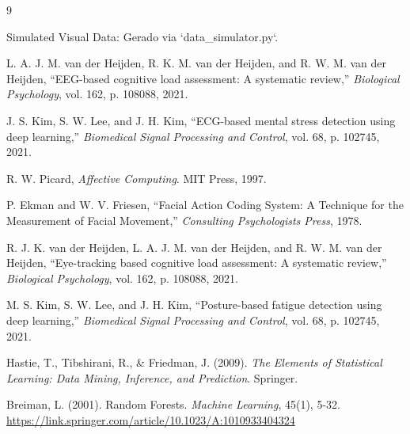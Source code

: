 \documentclass{article}
\begin{document}
\begin{thebibliography}{9}

 Simulated Visual Data: Gerado via `data_simulator.py`.

 L. A. J. M. van der Heijden, R. K. M. van der Heijden, and R. W. M. van der Heijden, ``EEG-based cognitive load assessment: A systematic review,'' \textit{Biological Psychology}, vol. 162, p. 108088, 2021.

 J. S. Kim, S. W. Lee, and J. H. Kim, ``ECG-based mental stress detection using deep learning,'' \textit{Biomedical Signal Processing and Control}, vol. 68, p. 102745, 2021.

 R. W. Picard, \textit{Affective Computing}. MIT Press, 1997.

 P. Ekman and W. V. Friesen, ``Facial Action Coding System: A Technique for the Measurement of Facial Movement,'' \textit{Consulting Psychologists Press}, 1978.

 R. J. K. van der Heijden, L. A. J. M. van der Heijden, and R. W. M. van der Heijden, ``Eye-tracking based cognitive load assessment: A systematic review,'' \textit{Biological Psychology}, vol. 162, p. 108088, 2021.

 M. S. Kim, S. W. Lee, and J. H. Kim, ``Posture-based fatigue detection using deep learning,'' \textit{Biomedical Signal Processing and Control}, vol. 68, p. 102745, 2021.

 Hastie, T., Tibshirani, R., & Friedman, J. (2009). \textit{The Elements of Statistical Learning: Data Mining, Inference, and Prediction}. Springer.

 Breiman, L. (2001). Random Forests. \textit{Machine Learning}, 45(1), 5-32. \url{https://link.springer.com/article/10.1023/A:1010933404324}

\end{thebibliography}
\end{document}
